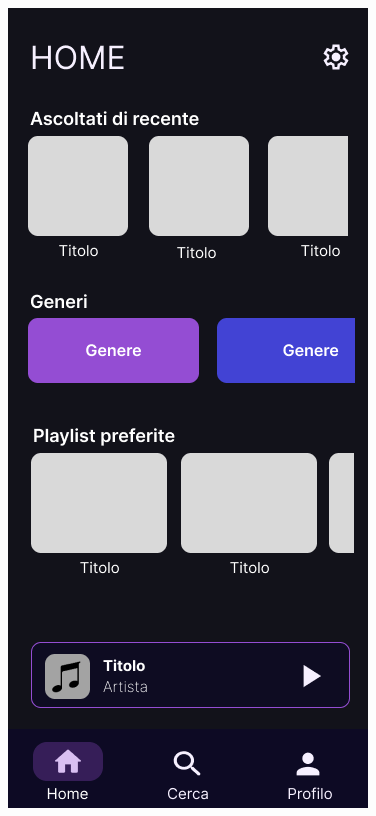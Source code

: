 \documentclass{article}
\begin{document}
		\begin{center}
			\begin{figure}[htbp]
				\centering
				\begin{minipage}[t]{0.2\textwidth}
					\centering
					\includegraphics[width=\textwidth]{Immagini/home_page}

\end{minipage}
\end{figure}
\end{center}
\end{document}
